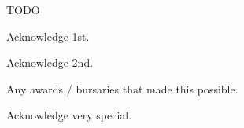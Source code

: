 TODO

Acknowledge 1st.

Acknowledge 2nd.

Any awards / bursaries that made this possible.

Acknowledge very special.


